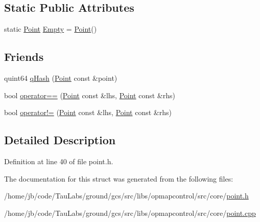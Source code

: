 \subsection*{\-Static \-Public \-Attributes}
\begin{DoxyCompactItemize}
\item 
static \hyperlink{structcore_1_1_point}{\-Point} \hyperlink{group___o_p_map_widget_ga8f0f8df337a57e048e21c0410bd1a7e3}{\-Empty} = \hyperlink{structcore_1_1_point}{\-Point}()
\end{DoxyCompactItemize}
\subsection*{\-Friends}
\begin{DoxyCompactItemize}
\item 
quint64 \hyperlink{group___o_p_map_widget_ga8feadb5b08ae788a3b3149c500a8577c}{q\-Hash} (\hyperlink{structcore_1_1_point}{\-Point} const \&point)
\item 
bool \hyperlink{group___o_p_map_widget_gad4a997c3713478cec06dca233eeefdba}{operator==} (\hyperlink{structcore_1_1_point}{\-Point} const \&lhs, \hyperlink{structcore_1_1_point}{\-Point} const \&rhs)
\item 
bool \hyperlink{group___o_p_map_widget_ga5f23d9a5e9c27a7fb6560e248ba8950e}{operator!=} (\hyperlink{structcore_1_1_point}{\-Point} const \&lhs, \hyperlink{structcore_1_1_point}{\-Point} const \&rhs)
\end{DoxyCompactItemize}


\subsection{\-Detailed \-Description}


\-Definition at line 40 of file point.\-h.



\-The documentation for this struct was generated from the following files\-:\begin{DoxyCompactItemize}
\item 
/home/jb/code/\-Tau\-Labs/ground/gcs/src/libs/opmapcontrol/src/core/\hyperlink{point_8h}{point.\-h}\item 
/home/jb/code/\-Tau\-Labs/ground/gcs/src/libs/opmapcontrol/src/core/\hyperlink{point_8cpp}{point.\-cpp}\end{DoxyCompactItemize}
